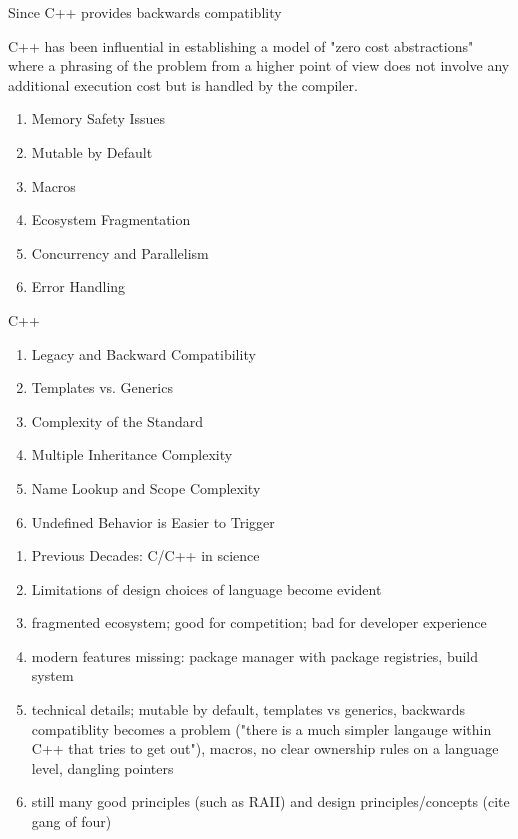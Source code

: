 \documentclass{article}
\begin{document}
Since C++ provides backwards compatiblity

C++ has been influential in establishing a model of "zero cost abstractions" where a phrasing of the
problem from a higher point of view does not involve any additional execution cost but is handled by
the compiler.

\begin{enumerate}
    \item Memory Safety Issues
    \item Mutable by Default
    \item Macros
    \item Ecosystem Fragmentation
    \item Concurrency and Parallelism
    \item Error Handling
\end{enumerate}

C++
\begin{enumerate}
    \item Legacy and Backward Compatibility
    \item Templates vs. Generics
    \item Complexity of the Standard
    \item Multiple Inheritance Complexity
    \item Name Lookup and Scope Complexity
    \item Undefined Behavior is Easier to Trigger
\end{enumerate}

\begin{enumerate}
    \item Previous Decades: C/C++ in science
    \item Limitations of design choices of language become evident
    \item fragmented ecosystem; good for competition; bad for developer experience
    \item modern features missing: package manager with package registries, build system
    \item technical details; mutable by default, templates vs generics, backwards
        compatiblity becomes a
        problem ("there is a much simpler langauge within C++ that tries to get out"),
        macros, no clear
        ownership rules on a language level, dangling pointers
    \item still many good principles (such as RAII) and design principles/concepts (cite
        gang of four)
\end{enumerate}
\end{document}
